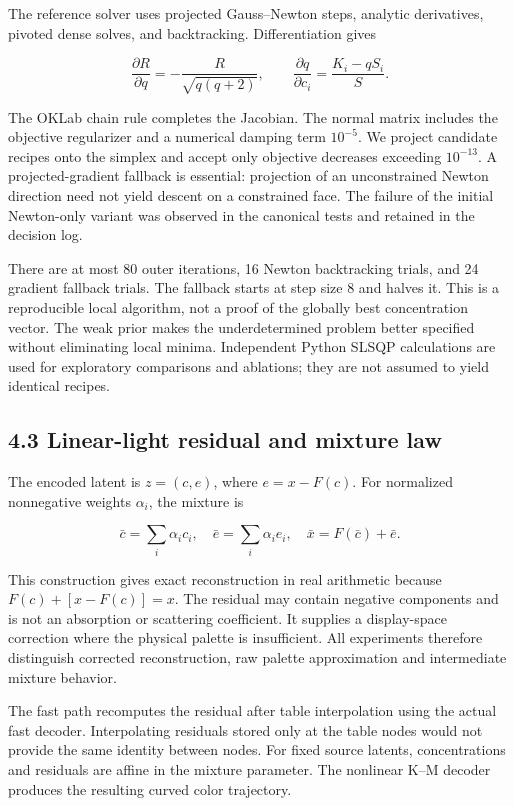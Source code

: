 \documentclass[
  10pt,
  twocolumn]{article}
\begin{document}
The reference solver uses projected Gauss--Newton steps, analytic
derivatives, pivoted dense solves, and backtracking. Differentiation
gives

\[\frac{\partial R}{\partial q}=-\frac{R}{\sqrt{q(q+2)}},\qquad
\frac{\partial q}{\partial c_i}=\frac{K_i-qS_i}{S}.\]

The OKLab chain rule completes the Jacobian. The normal matrix includes
the objective regularizer and a numerical damping term \(10^{-5}\). We
project candidate recipes onto the simplex and accept only objective
decreases exceeding \(10^{-13}\). A projected-gradient fallback is
essential: projection of an unconstrained Newton direction need not
yield descent on a constrained face. The failure of the initial
Newton-only variant was observed in the canonical tests and retained in
the decision log.

There are at most 80 outer iterations, 16 Newton backtracking trials,
and 24 gradient fallback trials. The fallback starts at step size 8 and
halves it. This is a reproducible local algorithm, not a proof of the
globally best concentration vector. The weak prior makes the
underdetermined problem better specified without eliminating local
minima. Independent Python SLSQP calculations are used for exploratory
comparisons and ablations; they are not assumed to yield identical
recipes.

\hypertarget{linear-light-residual-and-mixture-law}{%
\subsection{4.3 Linear-light residual and mixture
law}\label{linear-light-residual-and-mixture-law}}

The encoded latent is \(z=(c,e)\), where \(e=x-F(c)\). For normalized
nonnegative weights \(\alpha_i\), the mixture is

\[\bar c=\sum_i\alpha_ic_i,\quad \bar e=\sum_i\alpha_ie_i,
\quad \bar x=F(\bar c)+\bar e.\]

This construction gives exact reconstruction in real arithmetic because
\(F(c)+[x-F(c)]=x\). The residual may contain negative components and is
not an absorption or scattering coefficient. It supplies a display-space
correction where the physical palette is insufficient. All experiments
therefore distinguish corrected reconstruction, raw palette
approximation and intermediate mixture behavior.

The fast path recomputes the residual after table interpolation using
the actual fast decoder. Interpolating residuals stored only at the
table nodes would not provide the same identity between nodes. For fixed
source latents, concentrations and residuals are affine in the mixture
parameter. The nonlinear K--M decoder produces the resulting curved
color trajectory.
\end{document}
